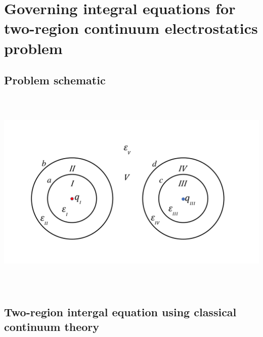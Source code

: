 \documentclass{article}
\begin{document}
\section{Governing integral equations for two-region continuum electrostatics problem}
\subsection{Problem schematic}

\begin{center}
\includegraphics[width=18cm, height=10cm]{schematic.pdf}
\end{center}

\subsection{Two-region intergal equation using classical continuum theory}
\end{document}
